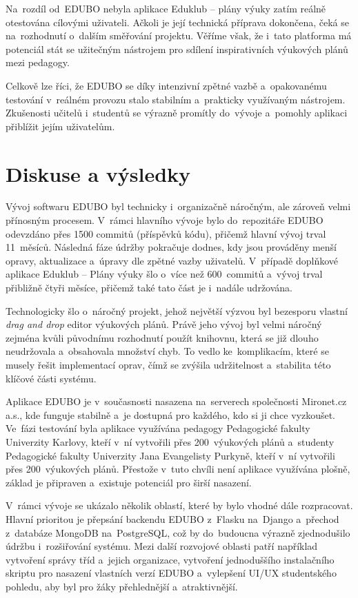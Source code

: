 \documentclass[male,czech,api_bc]{kitheses}
\begin{document}
Na~rozdíl od~EDUBO nebyla aplikace Eduklub – plány výuky zatím reálně otestována cílovými uživateli. Ačkoli je její technická příprava dokončena, čeká se na~rozhodnutí o~dalším směřování projektu. Věříme však, že i~tato platforma má potenciál stát se užitečným nástrojem pro sdílení inspirativních výukových plánů mezi pedagogy.

Celkově lze říci, že EDUBO se díky intenzivní zpětné vazbě a~opakovanému testování v~reálném provozu stalo stabilním a~prakticky využívaným nástrojem. Zkušenosti učitelů i~studentů se výrazně promítly do~vývoje a~pomohly aplikaci přiblížit jejím uživatelům.


\chapter{Diskuse a výsledky}

Vývoj softwaru EDUBO byl technicky i~organizačně náročným, ale zároveň velmi přínosným procesem. V~rámci hlavního vývoje bylo do~repozitáře EDUBO odevzdáno přes 1500 commitů (příspěvků kódu), přičemž hlavní vývoj trval 11~měsíců. Následná fáze údržby pokračuje dodnes, kdy jsou prováděny menší opravy, aktualizace a~úpravy dle zpětné vazby uživatelů. V~případě doplňkové aplikace Eduklub – Plány výuky šlo o~více než 600~commitů a~vývoj trval přibližně čtyři měsíce, přičemž také tato část je i~nadále udržována.

Technologicky šlo o~náročný projekt, jehož největší výzvou byl bezesporu vlastní \textit{drag and drop} editor výukových plánů. Právě jeho vývoj byl velmi náročný zejména kvůli původnímu rozhodnutí použít knihovnu, která se již dlouho neudržovala a~obsahovala množství chyb. To vedlo ke~komplikacím, které se musely řešit implementací oprav, čímž se zvýšila udržitelnost a~stabilita této klíčové části systému.

Aplikace EDUBO je v~současnosti nasazena na~serverech společnosti Mironet.cz a.s., kde funguje stabilně a~je dostupná pro každého, kdo si ji chce vyzkoušet. Ve~fázi testování byla aplikace využívána pedagogy Pedagogické fakulty Univerzity Karlovy, kteří v~ní vytvořili přes 200~výukových plánů a~studenty Pedagogické fakulty Univerzity Jana Evangelisty Purkyně, kteří v~ní vytvořili přes 200~výukových plánů. Přestože v~tuto chvíli není aplikace využívána plošně, základ je připraven a~existuje potenciál pro širší nasazení.

V~rámci vývoje se ukázalo několik oblastí, které by bylo vhodné dále rozpracovat. Hlavní prioritou je přepsání backendu EDUBO z~Flasku na~Django a~přechod z~databáze MongoDB na~PostgreSQL, což by do~budoucna výrazně zjednodušilo údržbu i~rozšiřování systému. Mezi další rozvojové oblasti patří například vytvoření správy tříd a~jejich organizace, vytvoření jednoduššího instalačního skriptu pro nasazení vlastních verzí EDUBO a~vylepšení UI/UX studentského pohledu, aby byl pro žáky přehlednější a~atraktivnější.
\end{document}

